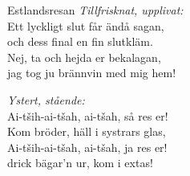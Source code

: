 \begin{song}{Estlandsresan}
	\vspace{.1cm}
	\; \emph{ Tillfrisknat, upplivat:}\\
	Ett lyckligt slut får ändå sagan,\\
	och dess final en fin slutkläm.\\
	Nej, ta och hejda er bekalagan,\\
	jag tog ju brännvin med mig hem!

	\vspace{-.1cm}
	\; \emph{ Ystert, stående:}\\
	Ai-tših-ai-tšah, ai-tšah, så res er!\\
	Kom bröder, häll i systrars glas,\\
	Ai-tših-ai-tšah, ai-tšah, ja res er!\\
	drick bägar’n ur, kom i extas!
	
\end{song}
